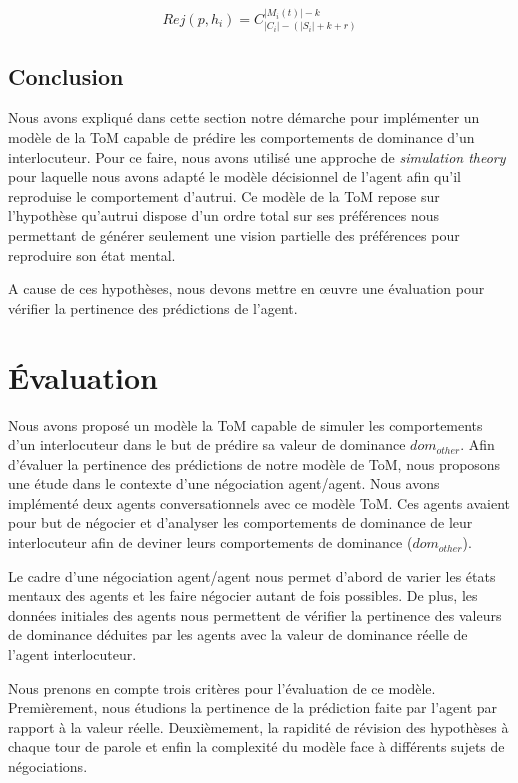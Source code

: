 \begin{equation}
Rej(p, h_i) = C_{|C_i|-(|S_i| + k + r)}^{|M_i(t)| - k}
\end{equation}

\subsection{Conclusion}
	Nous avons expliqué dans cette section notre démarche pour implémenter un modèle de la ToM capable de prédire les comportements de dominance d'un interlocuteur. Pour ce faire, nous avons utilisé une approche de \emph{simulation theory} pour laquelle nous avons adapté le modèle décisionnel de l'agent afin qu'il reproduise le comportement d'autrui. Ce modèle de la ToM repose sur l'hypothèse qu'autrui dispose d'un ordre total sur ses préférences nous permettant de générer  seulement une vision partielle des préférences pour reproduire son état mental. 
	
	A cause de ces hypothèses, nous devons mettre en œuvre une évaluation pour vérifier la pertinence des prédictions de l'agent.

\section{Évaluation}

Nous avons proposé un modèle la ToM capable de simuler les comportements d'un interlocuteur dans le but de prédire sa valeur de dominance $dom_{other}$. Afin d'évaluer la pertinence des prédictions de notre modèle de ToM, nous proposons une étude  dans le contexte d'une négociation agent/agent. Nous avons implémenté  deux agents conversationnels avec ce modèle ToM. Ces agents avaient pour but de négocier et d'analyser les comportements de dominance de leur interlocuteur afin de deviner leurs comportements de dominance ($dom_{other}$).

Le cadre d'une négociation agent/agent nous permet d'abord de varier les états mentaux des agents et les faire négocier autant de fois possibles.
De plus, les données initiales des agents nous permettent de vérifier la pertinence des valeurs de dominance déduites par les agents avec la valeur de dominance réelle de l'agent interlocuteur. 

Nous prenons en compte trois critères pour l'évaluation de ce modèle. Premièrement, nous étudions la pertinence de la prédiction faite par l'agent par rapport à la valeur réelle. Deuxièmement, la rapidité de révision des hypothèses à chaque tour de parole et enfin la complexité du modèle face à différents sujets de négociations.

